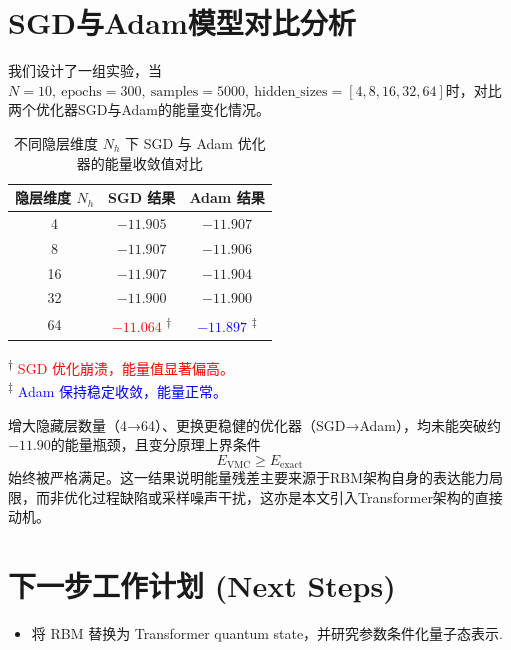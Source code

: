 \documentclass[11pt, a4paper]{article}
\begin{document}
	\section{SGD与Adam模型对比分析}
	我们设计了一组实验，当$N=10,\ \text{epochs}=300,\ \text{samples}=5000,\ \text{hidden\_sizes}=[4,8,16,32,64]$时，对比两个优化器SGD与Adam的能量变化情况。
	\begin{table}[htbp]
		\centering
		\caption{不同隐层维度 $N_h$ 下 SGD 与 Adam 优化器的能量收敛值对比}
		\label{tab:sgd_vs_adam}
		\begin{tabular}{ccc}
			\toprule
			隐层维度 $N_h$ & SGD 结果 & Adam 结果 \\
			\midrule
			4  & $-11.905$ & $-11.907$ \\
			8  & $-11.907$ & $-11.906$ \\
			16 & $-11.907$ & $-11.904$ \\
			32 & $-11.900$ & $-11.900$ \\
			64 & \textcolor{red}{$-11.064$} \textsuperscript{$\dagger$} 
			& \textcolor{blue}{$-11.897$} \textsuperscript{$\ddagger$} \\
			\bottomrule
		\end{tabular}
		\vspace{0.5em}
		\begin{flushleft}
			\footnotesize
			\textsuperscript{$\dagger$} \textcolor{red}{SGD 优化崩溃，能量值显著偏高。} \\
			\textsuperscript{$\ddagger$} \textcolor{blue}{Adam 保持稳定收敛，能量正常。}
		\end{flushleft}
	\end{table}
增大隐藏层数量（4→64）、更换更稳健的优化器（SGD→Adam），均未能突破约$-11.90$的能量瓶颈，且变分原理上界条件
\[
E_{\text{VMC}} \ge E_{\text{exact}}
\]
始终被严格满足。这一结果说明能量残差主要来源于RBM架构自身的表达能力局限，而非优化过程缺陷或采样噪声干扰，这亦是本文引入Transformer架构的直接动机。
	
	\section{下一步工作计划 (Next Steps)}
	\begin{itemize}
		\item [1.] 将 RBM 替换为 Transformer quantum state，并研究参数条件化量子态表示.
	\end{itemize}
	
	\vspace{2em}
		
		
		
	
\end{document}
